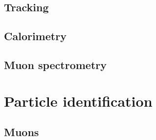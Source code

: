 \subsection{Tracking}
\subsection{Calorimetry}
\subsection{Muon spectrometry}

\section{Particle identification}

\subsection{Muons}


